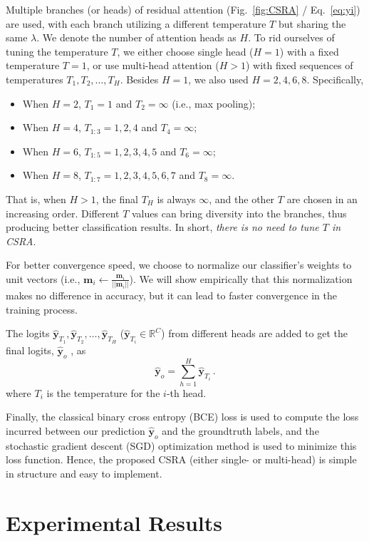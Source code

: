 \documentclass[10pt,twocolumn,letterpaper]{article}
\begin{document}
Multiple branches (or heads) of residual attention (Fig.~\ref{fig:CSRA} / Eq.~\ref{eq:yi}) are used, with each branch utilizing a different temperature $T$ but sharing the same $\lambda$. We denote the number of attention heads as $H$. To rid ourselves of tuning the temperature $T$, we either choose single head ($H=1$) with a fixed temperature $T=1$, or use multi-head attention ($H>1$) with fixed sequences of temperatures $T_1, T_2, \dots, T_H$. Besides $H=1$, we also used $H=2,4,6,8$. Specifically, 
\begin{itemize}
\item When $H=2$, $T_1=1$ and $T_2=\infty$ (i.e., max pooling); 
	\item When $H=4$, $T_{1:3}=1,2,4$ and $T_4 = \infty$; 
	\item When $H=6$, $T_{1:5}=1,2,3,4,5$ and $T_6=\infty$; 
	\item When $H=8$, $T_{1:7}=1,2,3,4,5,6,7$ and $T_8=\infty$. 
\end{itemize}
That is, when $H>1$, the final $T_H$ is always $\infty$, and the other $T$ are chosen in an increasing order. Different $T$ values can bring diversity into the branches, thus producing better classification results. In short, \emph{there is no need to tune $T$ in CSRA}.

For better convergence speed, we choose to normalize our classifier's weights to unit vectors (i.e., $\mathbf{m}_i \leftarrow \frac{\mathbf{m}_i}{||\mathbf{m}_i||}$). We will show empirically that this normalization makes no difference in accuracy, but it can lead to faster convergence in the training process.

The logits $\hat{\mathbf{y}}_{T_1},\hat{\mathbf{y}}_{T_2},\dots,\hat{\mathbf{y}}_{T_H}$ ($\hat{\mathbf{y}}_{T_i} \in \mathbb{R}^C$) from different heads are added to get the final logits, $\hat{\mathbf{y}}_{o}$ , as
\begin{equation}
	\hat{\mathbf{y}}_{o} = \sum_{h=1}^H \hat{\mathbf{y}}_{T_i} \,.
\end{equation}
where $T_i$ is the temperature for the $i$-th head.

Finally, the classical binary cross entropy (BCE) loss is used to compute the loss incurred between our prediction $\hat{\mathbf{y}}_{o}$ and the groundtruth labels, and the stochastic gradient descent (SGD) optimization method is used to minimize this loss function. Hence, the proposed CSRA (either single- or multi-head) is simple in structure and easy to implement.

\section{Experimental Results}
\end{document}
